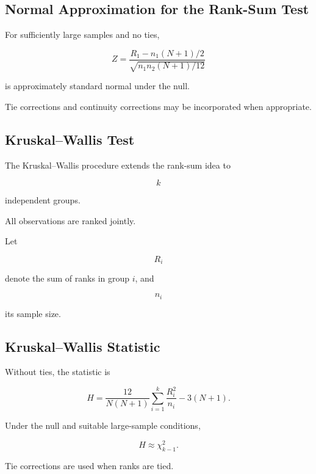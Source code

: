 \subsection{Normal Approximation for the Rank-Sum Test}
\label{subsec:rank-sum-normal-approx}

For sufficiently large samples and no ties,

\[
\boxed{
Z
=
\frac{
R_1
-
n_1(N+1)/2
}{
\sqrt{
n_1n_2(N+1)/12
}
}
}
\]

is approximately standard normal under the null.

Tie corrections and continuity corrections may be incorporated when
appropriate.

\subsection{Kruskal--Wallis Test}
\label{subsec:kruskal-wallis-test}

The Kruskal--Wallis procedure extends the rank-sum idea to

\[
k
\]

independent groups.

All observations are ranked jointly.

Let

\[
R_i
\]

denote the sum of ranks in group \(i\), and

\[
n_i
\]

its sample size.

\subsection{Kruskal--Wallis Statistic}
\label{subsec:kruskal-wallis-statistic}

Without ties, the statistic is

\[
\boxed{
H
=
\frac{
12
}{
N(N+1)
}
\sum_{i=1}^{k}
\frac{
R_i^2
}{
n_i
}
-
3(N+1).
}
\]

Under the null and suitable large-sample conditions,

\[
\boxed{
H
\approx
\chi^2_{k-1}.
}
\]

Tie corrections are used when ranks are tied.

